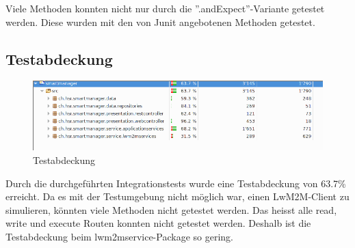 Viele Methoden konnten nicht nur durch die ''.andExpect''-Variante getestet werden. Diese wurden mit den von Junit angebotenen Methoden getestet.
\subsection{Testabdeckung}
\begin{figure}[H]
\centering
\includegraphics[scale=0.5]{../04_Realisierung/images/testcoverage.png}
\caption{Testabdeckung}
\end{figure}

Durch die durchgeführten Integrationstests wurde eine Testabdeckung von 63.7\% erreicht. Da es mit der Testumgebung nicht möglich war, einen LwM2M-Client zu simulieren, könnten viele Methoden nicht getestet werden. Das heisst alle read, write und execute Routen konnten nicht getestet werden. Deshalb ist die Testabdeckung beim lwm2mservice-Package so gering.